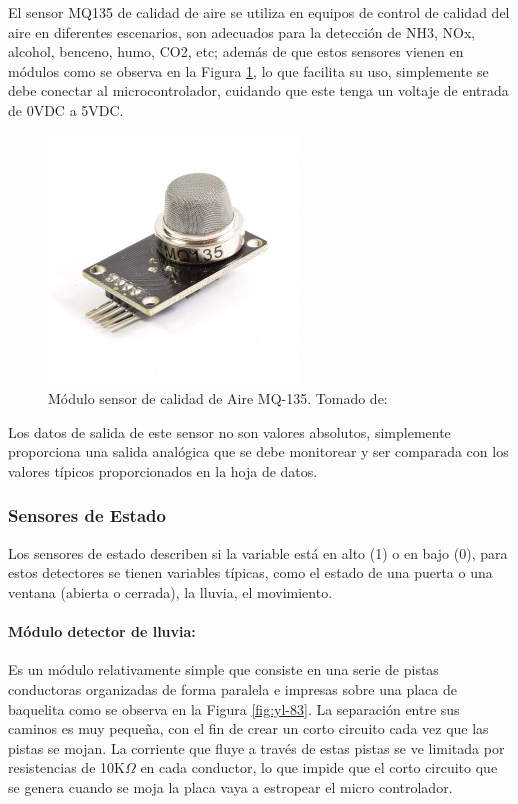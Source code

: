 El sensor MQ135 de calidad de aire se utiliza en equipos de control de calidad del aire en diferentes escenarios, son adecuados para la detección de NH3, NOx, alcohol, benceno, humo, CO2, etc; además de que estos sensores vienen en módulos como se observa en la Figura \ref{fig:sensor-calidad-aire-mq135}, lo que facilita su uso, simplemente se debe conectar al microcontrolador, cuidando que este tenga un voltaje de entrada de 0VDC a 5VDC. \cite{MQ1}

\begin{figure}[H]
	\centering
	\caption[Módulo sensor de calidad de Aire MQ-135.]{Módulo sensor de calidad de Aire MQ-135. Tomado de: \cite{MQ1}}
	\label{fig:sensor-calidad-aire-mq135}
 	\includegraphics[width=0.35\linewidth]{Imagenes/sensor-calidad-aire-mq135}
\end{figure}

Los datos de salida de este sensor no son valores absolutos, simplemente proporciona una salida analógica que se debe monitorear y ser comparada con los valores típicos proporcionados en la hoja de datos.\cite{MQ2}

\subsubsection{Sensores de Estado}

Los sensores de estado describen si la variable está en alto (1) o en bajo (0), para estos detectores se tienen variables típicas, como el estado de una puerta o una ventana (abierta o cerrada), la lluvia, el movimiento.

\paragraph{Módulo detector de lluvia: }

Es un módulo relativamente simple que consiste en una serie de pistas conductoras organizadas de forma paralela e impresas sobre una placa de baquelita como se observa en la Figura \ref{fig:yl-83}. La separación entre sus caminos es muy pequeña, con el fin de crear un corto circuito cada vez que las pistas se mojan. La corriente que fluye a través de estas pistas se ve limitada por resistencias de 10K$\Omega$ en cada conductor, lo que impide que el corto circuito que se genera cuando se moja la placa vaya a estropear el micro controlador.\cite{LLU}

